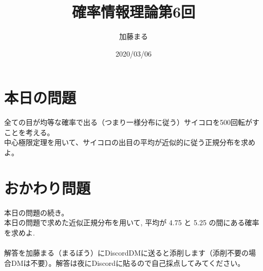 \documentclass[a4j,uplatex]{jsarticle}
\title{確率情報理論第6回}
\author{加藤まる}
\date{2020/03/06}
\begin{document}
\maketitle

\section*{本日の問題}
全ての目が均等な確率で出る（つまり一様分布に従う）サイコロを500回転がすことを考える。\\
中心極限定理を用いて、サイコロの出目の平均が近似的に従う正規分布を求めよ。



\section*{おかわり問題}
本日の問題の続き。\\
本日の問題で求めた近似正規分布を用いて, 平均が 4.75 と 5.25 の間にある確率を求めよ.
\\
\\
解答を加藤まる（まるぼう）にDiscordDMに送ると添削します（添削不要の場合DMは不要）。解答は夜にDiscordに貼るので自己採点してみてください。
\end{document}
